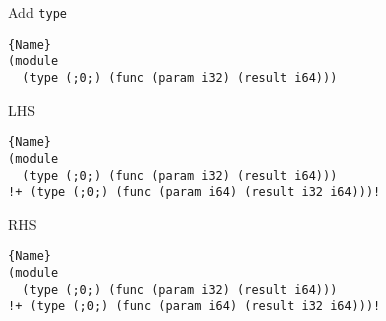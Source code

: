 Add \texttt{type} 
\vspace{-4mm}
\begin{lstlisting}[numbers=none]{Name}
(module
  (type (;0;) (func (param i32) (result i64)))
        \end{lstlisting}   
LHS
\begin{lstlisting}[numbers=none]{Name}
(module
  (type (;0;) (func (param i32) (result i64)))
!+ (type (;0;) (func (param i64) (result i32 i64)))!
        \end{lstlisting}  
\hrulefill

RHS
\begin{lstlisting}[numbers=none]{Name}
(module
  (type (;0;) (func (param i32) (result i64)))
!+ (type (;0;) (func (param i64) (result i32 i64)))!
        \end{lstlisting}   


